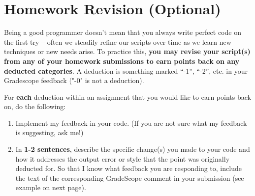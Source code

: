 \documentclass{homework}
\begin{document}
\newpage

\section*{Homework Revision (Optional)}
Being a good programmer doesn't mean that you always write perfect code on the first try – often we steadily refine our scripts over time as we learn new techniques or new needs arise. To practice this, \textbf{you may revise your script(s) from any of your homework submissions to earn points back on any deducted categories}. A deduction is something marked “-1”, “-2”, etc. in your Gradescope feedback ("-0" is not a deduction). 


For \textbf{each} deduction within an assignment that you would like to earn points back on, do the following:
\begin{enumerate}
    \item Implement my feedback in your code. (If you are not sure what my feedback is suggesting, ask me!)
    \item In \textbf{1-2 sentences}, describe the specific change(s) you made to your code and how it addresses the output error or style that the point was originally deducted for. So that I know what feedback you are responding to, include the text of the corresponding GradeScope comment in your submission (see example on next page).
\end{enumerate}
\end{document}
